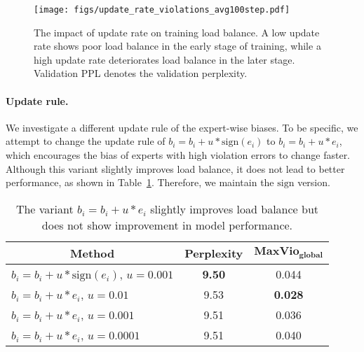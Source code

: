 \documentclass{article} %
\begin{document}
\begin{figure}[t]
  \centering
    \texttt{[image: figs/update\_rate\_violations\_avg100step.pdf]}
\caption{The impact of update rate on training load balance. A low update rate shows poor load balance in the early stage of training, while a high update rate deteriorates load balance in the later stage. Validation PPL denotes the validation perplexity.}
\label{fig:update_rate_violations_avg100step.pdf}
\end{figure}


\paragraph{Update rule.}
We investigate a different update rule of the expert-wise biases. 
To be specific, we attempt to change the update rule of $ b_i =  b_i + u*\mathrm{sign}(e_i)$ to $b_i = b_i + u*e_i$, which encourages the bias of experts with high violation errors to change faster. Although this variant slightly improves load balance, it does not lead to better performance, as shown in Table~\ref{tab:update_rule}.
Therefore, we maintain the $\mathrm{sign}$ version.%

\begin{table}[t]
\caption{The variant $ b_i = b_i + u*e_i$ slightly improves load balance but does not show improvement in model performance.}
\label{tab:update_rule}
\begin{center}
\begin{tabular}{l|c|c}
\toprule
\multicolumn{1}{c|}{\textbf{Method}} & \textbf{Perplexity} & $\textbf{MaxVio}_\textbf{global}$ \\
\midrule
$b_i =  b_i + u*\text{sign}(e_i)$, $u=0.001$ & \textbf{9.50} & 0.044 \\
$b_i = b_i + u*e_i$, $u=0.01$ & 9.53 & \textbf{0.028}\\ 
$ b_i =  b_i + u*e_i$, $u=0.001$ &  9.51 & 0.036 \\
$ b_i = b_i + u*e_i$, $u=0.0001$ & 9.51  & 0.040 \\
\bottomrule
\end{tabular}
\end{center}
\end{table}
\end{document}
